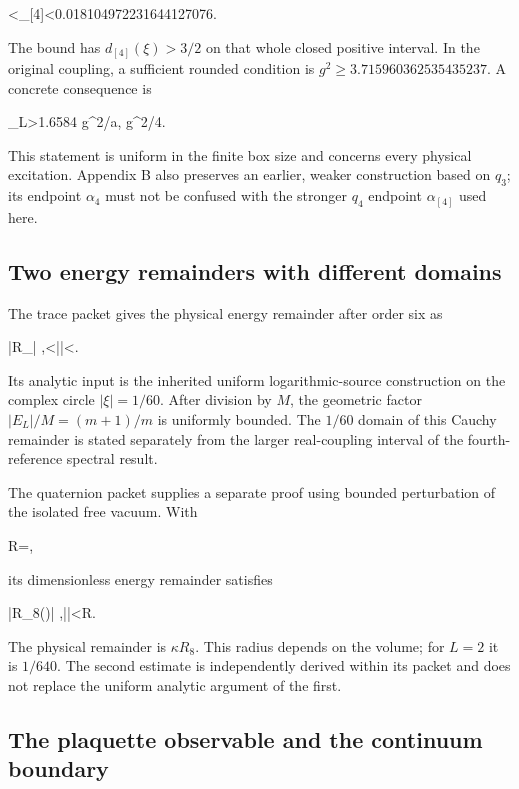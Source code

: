 \documentclass[11pt,a4paper]{article}
\renewcommand{\[}{\begingroup\small\originaldisplaystart}
\renewcommand{\]}{\originaldisplayend\endgroup}
\begin{document}
\[0.018104972231644127075<\alpha_{[4]}<0.018104972231644127076.\]

The bound has \(d_{[4]}(\xi)>3/2\) on that whole closed positive
interval. In the original coupling, a sufficient rounded condition is
\(g^2\geq3.715960362535435237\). A concrete consequence is

\[\Delta_L>1.6584\,\,g^2/a,
\qquad g^2/4.\]

This statement is uniform in the finite box size and concerns every
physical excitation. Appendix B also preserves an earlier, weaker
construction based on \(q_3\); its endpoint \(\alpha_4\) must not be
confused with the stronger \(q_4\) endpoint \(\alpha_{[4]}\) used here.

\subsection{Two energy remainders with different
domains}\label{two-energy-remainders-with-different-domains}

The trace packet gives the physical energy remainder after order six as

\[
|R_{}|\leq{}
,<|\xi|<.
\]

Its analytic input is the inherited uniform logarithmic-source
construction on the complex circle \(|\xi|=1/60\). After division by
\(M\), the geometric factor \(|E_L|/M=(m+1)/m\) is uniformly bounded.
The \(1/60\) domain of this Cauchy remainder is stated separately from
the larger real-coupling interval of the fourth-reference spectral
result.

The quaternion packet supplies a separate proof using bounded
perturbation of the isolated free vacuum. With

\[R=,\]

its dimensionless energy remainder satisfies

\[|R_8(\xi)|\leq{}
,\qquad |\xi|<R.\]

The physical remainder is \(\kappa R_8\). This radius depends on the
volume; for \(L=2\) it is \(1/640\). The second estimate is
independently derived within its packet and does not replace the uniform
analytic argument of the first.

\subsection{The plaquette observable and the continuum
boundary}\label{the-plaquette-observable-and-the-continuum-boundary}
\end{document}
